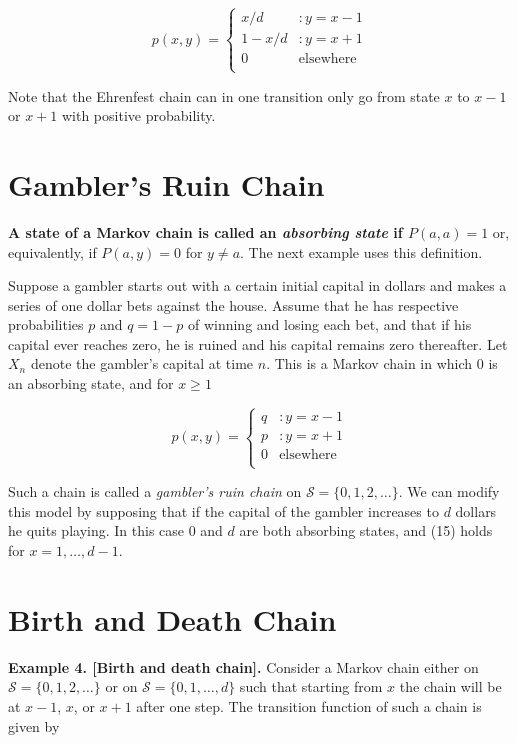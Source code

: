 \documentclass[12pt,openany]{book}
\theoremstyle{definition}
\begin{document}
	\[
	p(x,y)=\begin{cases}
		x/d &:y=x-1\\
		1-x/d &:y=x+1\\
		0 &\text{elsewhere}\\
	\end{cases}
	\]
	
	Note that the Ehrenfest chain can in one transition only go from state \( x \) to \( x - 1 \) or \( x + 1 \) with positive probability.
	
	\newpage
	\section{Gambler's Ruin Chain}
	
	\textbf{A state of a Markov chain is called an \textit{absorbing state} if \( P(a, a) = 1 \)} or, equivalently, if \( P(a, y) = 0 \) for \( y \neq a \). The next example uses this definition.
	
	Suppose a gambler starts out with a certain initial capital in dollars and makes a series of one dollar bets against the house. Assume that he has respective probabilities \( p \) and \( q = 1 - p \) of winning and losing each bet, and that if his capital ever reaches zero, he is ruined and his capital remains zero thereafter. Let \( X_n \) denote the gambler's capital at time \( n \). This is a Markov chain in which 0 is an absorbing state, and for \( x \geq 1 \)
	
	\[
	p(x,y)=\begin{cases}
		q &:y=x-1\\
		p &:y=x+1\\
		0 &\text{elsewhere}\\
	\end{cases}
	\]
	
	Such a chain is called a \textit{gambler's ruin chain} on \( \mathcal{S} = \{0, 1, 2, \ldots\} \). We can modify this model by supposing that if the capital of the gambler increases to \( d \) dollars he quits playing. In this case 0 and \( d \) are both absorbing states, and (15) holds for \( x = 1, \ldots, d - 1 \).
	
	\section{Birth and Death Chain}
	\textbf{Example 4. [Birth and death chain].} Consider a Markov chain either on \( \mathcal{S} = \{0, 1, 2, \ldots\} \) or on \( \mathcal{S} = \{0, 1, \ldots, d\} \) such that starting from \( x \) the chain will be at \( x - 1 \), \( x \), or \( x + 1 \) after one step. The transition function of such a chain is given by
	
\end{document}
